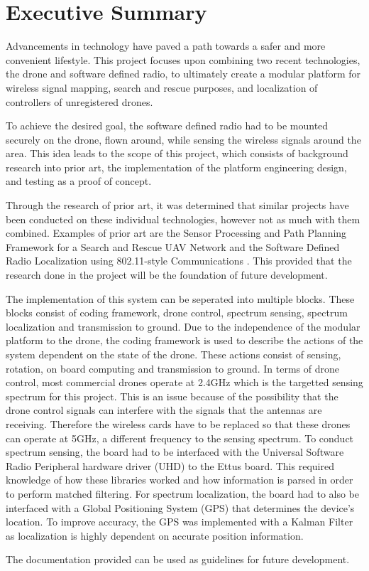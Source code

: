 \chapter*{Executive Summary}
Advancements in technology have paved a path towards a safer and more convenient lifestyle. This project focuses upon combining two recent technologies, the drone and software defined radio, to ultimately create a modular platform for wireless signal mapping, search and rescue purposes, and localization of controllers of unregistered drones. \par

To achieve the desired goal, the software defined radio had to be mounted securely on the drone, flown around, while sensing the wireless signals around the area. This idea leads to the scope of this project, which consists of background research into prior art, the implementation of the platform engineering design, and testing as a proof of concept. \par

Through the research of prior art, it was determined that similar projects have been conducted on these individual technologies, however not as much with them combined. Examples of prior art are the Sensor Processing and Path Planning Framework for a Search and Rescue UAV Network \cite{path_planning_snr_mqp} and the Software Defined Radio Localization using 802.11-style Communications \cite{sdr_localization_mqp}. This provided that the research done in the project will be the foundation of future development. \par

The implementation of this system can be seperated into multiple blocks. These blocks consist of coding framework, drone control, spectrum sensing, spectrum localization and transmission to ground. Due to the independence of the modular platform to the drone, the coding framework is used to describe the actions of the system dependent on the state of the drone. These actions consist of sensing, rotation, on board computing and transmission to ground. In terms of drone control, most commercial drones operate at 2.4GHz which is the targetted sensing spectrum for this project. This is an issue because of the possibility that the drone control signals can interfere with the signals that the antennas are receiving. Therefore the wireless cards have to be replaced so that these drones can operate at 5GHz, a different frequency to the sensing spectrum. To conduct spectrum sensing, the board had to be interfaced with the Universal Software Radio Peripheral hardware driver (UHD) to the Ettus board. This required knowledge of how these libraries worked and how information is parsed in order to perform matched filtering. For spectrum localization, the board had to also be interfaced with a Global Positioning System (GPS) that determines the device's location. To improve accuracy, the GPS was implemented with a Kalman Filter as localization is highly dependent on accurate position information.










The documentation provided can be used as guidelines for future development.